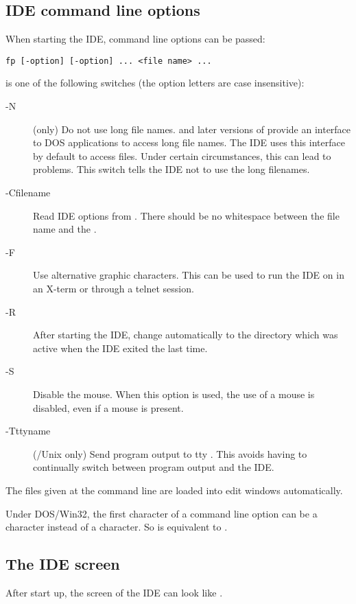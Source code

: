 \subsection{IDE command line options}
When starting the IDE, command line options can be passed:
\begin{verbatim}
fp [-option] [-option] ... <file name> ...
\end{verbatim}
 is one of the following switches (the option letters
are case insensitive):
\begin{description}
\item [-N] (\dos only) Do not use long file names.  and later
versions of \windows provide an interface to DOS applications to access
long file names.
The IDE uses this interface by default to access files. Under certain
circumstances, this can lead to problems. This switch tells the IDE not to
use the long filenames.
\item [-Cfilename] Read IDE options from . 
There should be no whitespace between the file name and the .
\item [-F] Use alternative graphic characters. This can be used to run the
IDE on \linux in an X-term or through a telnet session.
\item [-R] After starting the IDE, change automatically to the directory
which was active when the IDE exited the last time.
\item [-S] Disable the mouse. When this option is used, the use of a mouse is
disabled, even if a mouse is present.
\item[-Tttyname] (\linux/Unix only) Send program output to tty .
This avoids having to continually switch between program output and the IDE.
\end{description}
The files given at the command line are loaded into edit windows automatically.

\begin{remark}
Under DOS/Win32, the first character of a command line option can be a \var{/}
character instead of a \var{-} character. So  is equivalent to .
\end{remark}

\subsection{The IDE screen}

After start up, the screen of the IDE can look like .

